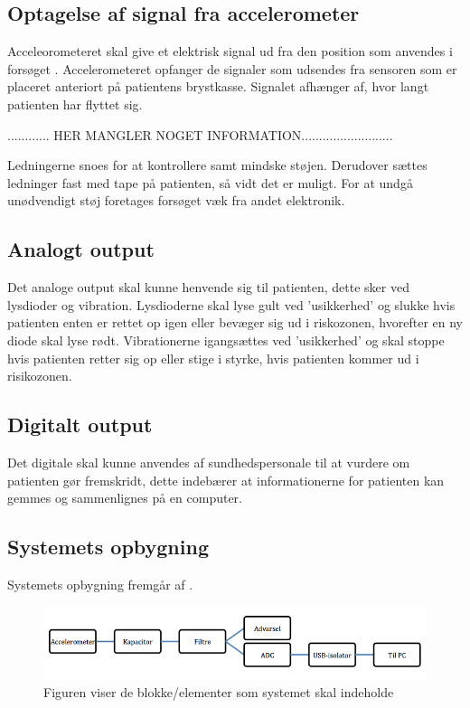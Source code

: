 \subsection{Optagelse af signal fra accelerometer}
Acceleorometeret skal give et elektrisk signal ud fra den position som anvendes i forsøget . Accelerometeret opfanger de signaler som udsendes fra sensoren som er placeret anteriort på patientens brystkasse. Signalet afhænger af, hvor langt patienten har flyttet sig. 

............ HER MANGLER NOGET INFORMATION..........................

Ledningerne snoes for at kontrollere samt mindske støjen. Derudover sættes ledninger fast med tape på patienten, så vidt det er muligt. For at undgå unødvendigt støj foretages forsøget væk fra andet elektronik.  %



\subsection{Analogt output}
Det analoge output skal kunne henvende sig til patienten, dette sker ved lysdioder og vibration. Lysdioderne skal lyse gult ved 'usikkerhed' og slukke hvis patienten enten er rettet op igen eller bevæger sig ud i riskozonen, hvorefter en ny diode skal lyse rødt. Vibrationerne igangsættes ved 'usikkerhed' og skal stoppe hvis patienten retter sig op eller stige i styrke, hvis patienten kommer ud i risikozonen. 

\subsection{Digitalt output}
Det digitale skal kunne anvendes af sundhedspersonale til at vurdere om patienten gør fremskridt, dette indebærer at informationerne for patienten kan gemmes og sammenlignes på en computer. 


\subsection{Systemets opbygning}
Systemets opbygning fremgår af .

\begin{figure}[H]
	\centering
	\includegraphics[scale=0.62]{figures/cProblemloesning/blokdiagram1.png}
	\caption{Figuren viser de blokke/elementer som systemet skal indeholde}
	\label{kravblok}
\end{figure}

